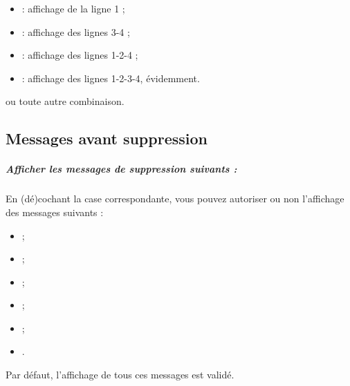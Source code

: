 \begin{itemize}
	\item {} : affichage de la ligne 1 ;
	\item {} : affichage des lignes 3-4 ;
	\item {} : affichage des lignes 1-2-4 ;
	\item {} : affichage des lignes 1-2-3-4, évidemment.
\end{itemize}

ou toute autre combinaison.


\subsection{Messages avant suppression\label{setup-operations-remove}}

\subparagraph{Afficher les messages de suppression suivants :}

En (dé)cochant la case correspondante, vous pouvez autoriser ou non l'affichage des messages suivants :

\begin{itemize}
	\ifIllustration
	\label{setup-messagesDelete-img}
	\fi
	\item {} ;
	\item {} ;
	\item {} ;
	\item {} ;
	\item {} ; 
	\item {}.
\end{itemize}

\ifIllustration
\fi

Par défaut, l'affichage de tous ces messages est validé.

\ifIllustration
\fi


